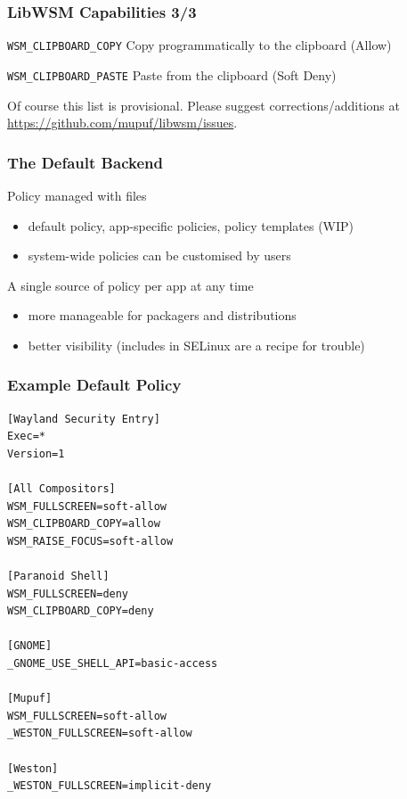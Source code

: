 \begin{frame}
\frametitle{LibWSM Capabilities 3/3}
	\begin{block}{\texttt{WSM\_CLIPBOARD\_COPY}}
	Copy programmatically to the clipboard ({\color{xorg-palette-light}Allow})
	\end{block}

	\begin{block}{\texttt{WSM\_CLIPBOARD\_PASTE}}
	Paste from the clipboard ({\color{xorg-palette-light}Soft Deny})
	\end{block}
	
	\vspace{1.5em}
	
	\begin{important}
	Of course this list is provisional. Please suggest corrections/additions
	at \url{https://github.com/mupuf/libwsm/issues}.
	\end{important}
	
	\vspace{3em}
\end{frame}


\begin{frame}
\frametitle{The Default Backend}

	\begin{block}{Policy managed with files}
	\begin{itemize}
	\item default policy, app-specific policies, policy templates (WIP)
	\item system-wide policies can be customised by users
	\end{itemize}
	\end{block}

	\begin{block}{A single source of policy per app at any time}
	\begin{itemize}
	\item more manageable for packagers and distributions
	\item better visibility (includes in SELinux are a recipe for trouble)
	\end{itemize}
	\end{block}
\end{frame}


\begin{frame}[fragile]
\frametitle{Example Default Policy}

\tiny
	\begin{verbatim}
[Wayland Security Entry]
Exec=*
Version=1

[All Compositors]
WSM_FULLSCREEN=soft-allow
WSM_CLIPBOARD_COPY=allow
WSM_RAISE_FOCUS=soft-allow

[Paranoid Shell]
WSM_FULLSCREEN=deny
WSM_CLIPBOARD_COPY=deny

[GNOME]
_GNOME_USE_SHELL_API=basic-access

[Mupuf]
WSM_FULLSCREEN=soft-allow
_WESTON_FULLSCREEN=soft-allow

[Weston]
_WESTON_FULLSCREEN=implicit-deny
	\end{verbatim}
\normalsize

\end{frame}


